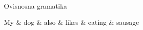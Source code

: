 Ovisnosna gramatika

\begin{dependency}[theme = simple]
\begin{deptext}[column sep=1em]
My \& dog \& also \& likes \& eating \& sausage \\
\end{deptext}
\end{dependency}
